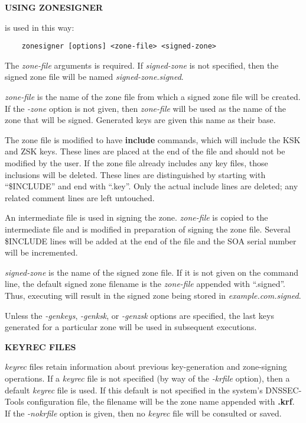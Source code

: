 {\bf USING ZONESIGNER}

 is used in this way:

\begin{verbatim}
    zonesigner [options] <zone-file> <signed-zone>
\end{verbatim}

The {\it zone-file} arguments is required.  If {\it signed-zone} is not
specified, then the signed zone file will be named {\it signed-zone.signed}.

{\it zone-file} is the name of the zone file from which a signed zone file
will be created.  If the {\it -zone} option is not given, then {\it zone-file}
will be used as the name of the zone that will be signed.  Generated keys are
given this name as their base.

The zone file is modified to have {\bf include} commands, which will include the
KSK and ZSK keys.  These lines are placed at the end of the file and should
not be modified by the user.  If the zone file already includes any key files,
those inclusions will be deleted.  These lines are distinguished by starting
with ``\$INCLUDE'' and end with ``.key''.  Only the actual include lines are
deleted; any related comment lines are left untouched.

An intermediate file is used in signing the zone.  {\it zone-file} is copied to
the intermediate file and is modified in preparation of signing the zone file.
Several \$INCLUDE lines will be added at the end of the file and the SOA serial
number will be incremented.

{\it signed-zone} is the name of the signed zone file.  If it is not given on
the command line, the default signed zone filename is the {\it zone-file}
appended with ``.signed''.  Thus, executing  will
result in the signed zone being stored in {\it example.com.signed}.

Unless the {\it -genkeys}, {\it -genksk}, or {\it -genzsk} options are
specified, the last keys generated for a particular zone will be used in
subsequent  executions.

{\bf KEYREC FILES}

{\it keyrec} files retain information about previous key-generation and
zone-signing operations.  If a {\it keyrec} file is not specified (by way of
the {\it -krfile} option), then a default {\it keyrec} file is used.  If this
default is not specified in the system's DNSSEC-Tools configuration file, the
filename will be the zone name appended with {\bf .krf}.  If the {\it
-nokrfile} option is given, then no {\it keyrec} file will be consulted or
saved.


